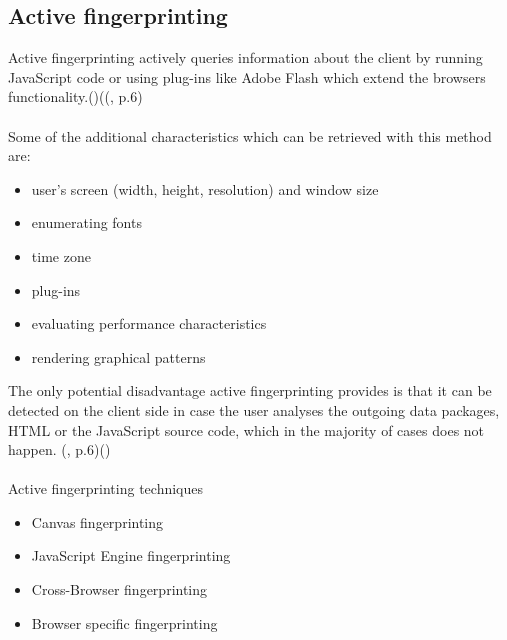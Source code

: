 \subsection{Active fingerprinting}
Active fingerprinting actively queries information about the client by running JavaScript code or using plug-ins like Adobe Flash which extend the browsers functionality.(\textcite{web17})((\textcite{doty18}, p.6)\\\\
Some of the additional characteristics which can be retrieved with this method are:
\begin{itemize}
	\item user's screen (width, height, resolution) and window size
	\item enumerating fonts
	\item time zone
	\item plug-ins
	\item evaluating performance characteristics
	\item rendering graphical patterns\\
\end{itemize}
The only potential disadvantage active fingerprinting provides is that it  can be detected on the client side in case the user analyses the outgoing data packages, HTML or the JavaScript source code, which in the majority of cases does not happen. (\textcite{doty18}, p.6)(\textcite{web17})\\\\
Active fingerprinting techniques
\begin{itemize}
	\item Canvas fingerprinting
	\item JavaScript Engine fingerprinting
	\item Cross-Browser fingerprinting
	\item Browser specific fingerprinting
\end{itemize}

